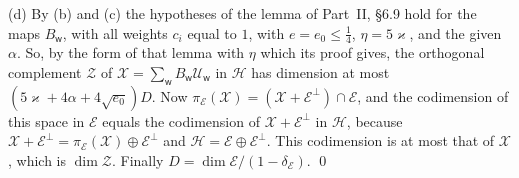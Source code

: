 \documentclass[11pt,letterpaper]{article}
\begin{document}
(d) By (b) and (c) the hypotheses of the lemma of Part~II, \S6.9 hold for the maps $B_{\mathsf w}$, with
all weights $c_i$ equal to $1$, with $e=e_0\le\frac14$, $\eta=5\varkappa$, and the given $\alpha$. So, by the form of
that lemma with $\eta$ which its proof gives, the orthogonal
complement $\mathcal Z$ of $\mathcal X=\sum_{\mathsf w}B_{\mathsf w}\mathcal U_{\mathsf w}$ in $\mathcal H$ has
dimension at most $(5\varkappa+4\alpha+4\sqrt{e_0})D$. Now $\pi_{\mathcal E}(\mathcal X)=(\mathcal X+\mathcal E^\perp)\cap\mathcal E$,
and the codimension of this space in $\mathcal E$ equals the codimension of $\mathcal X+\mathcal E^\perp$ in
$\mathcal H$, because $\mathcal X+\mathcal E^\perp=\pi_{\mathcal E}(\mathcal X)\oplus\mathcal E^\perp$ and
$\mathcal H=\mathcal E\oplus\mathcal E^\perp$. This codimension is at most that of $\mathcal X$, which is
$\dim\mathcal Z$. Finally $D=\dim\mathcal E/(1-\delta_{\mathcal E})$. \qed
\end{document}
